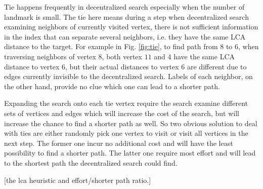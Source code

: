 Tie happens frequently in decentralized search especially when the number of landmark is small. The tie here means during a step when decentralized search examining neighbors of currently visited vertex, there is not sufficient information in the index that can separate several neighbors, i.e. they have the same LCA distance to the target. For example in Fig. \ref{fig:tie}, to find path from $8$ to $6$, when traversing neighbors of vertex $8$, both vertex $11$ and $4$ have the same LCA distance to vertex $6$, but their actual distances to vertex $6$ are different due to edges currently invisible to the decentralized search. Labels of each neighbor, on the other hand, provide no clue which one can lead to a shorter path.

Expanding the search onto each tie vertex require the search examine different sets of vertices and edges which will increase the cost of the search, but will increase the chance to find a shorter path as well. So two obvious solution to deal with ties are either randomly pick one vertex to visit or visit all vertices in the next step. The former one incur no additional cost and will have the least possibility to find a shorter path. The latter one require most effort and will lead to the shortest path the decentralized search could find.

[the lca heuristic and effort/shorter path ratio.]
